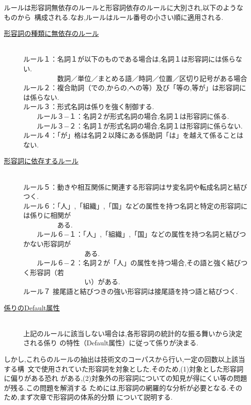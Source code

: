 ルールは形容詞無依存のルールと形容詞依存のルールに大別され,以下のような\mbox{ものから
構成}される.なお,ルールはルール番号の小さい順に適用される.
\begin{description}
\item[\underline{形容詞の種類に無依存のルール}]~\\
  ルール１：名詞１が以下のものである場合は,名詞１は形容詞には係らない.\\
  　　　　　数詞／単位／まとめる語／時詞／位置／区切り記号がある場合\\
  ルール２：複合助詞（での,からの,への等）及び「等の,等が」は形容詞には係らない.\\
  ルール３：形式名詞は係りを強く制御する.\\
  　　ルール３−１：名詞２が形式名詞の場合,名詞１は形容詞に係る.\\
  　　ルール３−２：名詞１が形式名詞の場合,名詞１は形容詞に係らない.\\
  ルール４：「が」格は名詞２以降にある係助詞「は」を越えて係ることはない.

\item[\underline{形容詞に依存するルール}]~\\
  ルール５：動きや相互関係に関連する形容詞はサ変名詞や転成名詞と結びつく.\\
  ルール６：「人」,「組織」,「国」などの属性を持つ名詞と特定の形容詞には係りに相関が\\　　　　　ある.\\
  　　ルール６−１：「人」,「組織」,「国」などの属性を持つ名詞と結びつかない形容詞が\\　　　　　　　　　ある.\\
  　　ルール６−２：名詞２が「人」の属性を持つ場合,その語と強く結びつく形容詞（若\\　　　　　　　　　い）がある.\\
  ルール７ 接尾語と結びつきの強い形容詞は接尾語を持つ語と結びつく.

\item[\underline{係りのDefault属性}]~\\
  上記のルールに該当しない場合は,各形容詞の統計的な振る舞いから決定される係り
  の特性（Default属性）に従って係りが決まる.
\end{description}

しかし,これらのルールの抽出は技術文のコーパスから行い,一定の回数以上\mbox{該当する構
文で使}用されていた形容詞を対象とした.そのため,(1)対象とした形容詞に偏りがある恐れ
がある,(2)対象外の形容詞についての知見が得にくい等の問題が残る.この問題を解消する
ためには,形容詞の網羅的な分析が必要となる.そのため,まず次章で形容詞の体系的分類
について説明する.　

